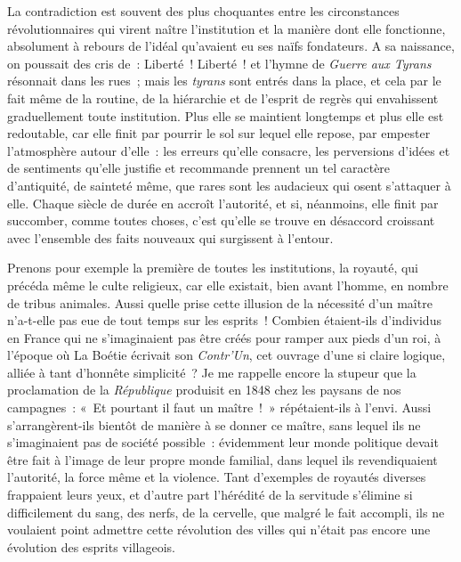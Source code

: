 \documentclass[french,twoside]{book} %
\begin{document}
La contradiction est souvent des plus choquantes entre les circonstances révolutionnaires qui virent naître l’institution et la manière dont elle fonctionne, absolument à rebours de l’idéal qu’avaient eu ses naïfs fondateurs. A sa naissance, on poussait des cris de : Liberté ! Liberté ! et l’hymne de \emph{Guerre  aux Tyrans} résonnait dans les rues ; mais les \emph{tyrans} sont entrés dans la place, et cela par le fait même de la routine, de la hiérarchie et de l’esprit de regrès qui envahissent graduellement toute institution. Plus elle se maintient longtemps et plus elle est redoutable, car elle finit par pourrir le sol sur lequel elle repose, par empester l’atmosphère autour d’elle : les erreurs qu’elle consacre, les perversions d’idées et de sentiments qu’elle justifie et recommande prennent un tel caractère d’antiquité, de sainteté même, que rares sont les audacieux qui osent s’attaquer à elle. Chaque siècle de durée en accroît l’autorité, et si, néanmoins, elle finit par succomber, comme toutes choses, c’est qu’elle se trouve en désaccord croissant avec l’ensemble  des faits nouveaux qui surgissent à l’entour.\par
Prenons pour exemple la première de toutes les institutions, la royauté, qui précéda même le culte religieux, car elle existait, bien avant l’homme, en nombre de tribus animales. Aussi quelle prise cette illusion de la nécessité d’un maître n’a-t-elle pas eue de tout temps sur les esprits ! Combien étaient-ils d’individus en France qui ne s’imaginaient pas être créés pour ramper aux pieds d’un roi, à l’époque où La Boétie écrivait son \emph{Contr’Un}, cet ouvrage d’une si claire logique, alliée à tant d’honnête simplicité ? Je me rappelle encore la stupeur que la proclamation de la \emph{République} produisit en 1848 chez les paysans de nos campagnes :  « Et pourtant il faut un maître ! » répétaient-ils à l’envi. Aussi s’arrangèrent-ils bientôt de manière à se donner ce maître, sans lequel ils ne s’imaginaient pas de société possible : évidemment leur monde politique devait être fait à l’image de leur propre monde familial, dans lequel ils revendiquaient l’autorité, la force même et la violence. Tant d’exemples de royautés diverses frappaient leurs yeux, et d’autre part l’hérédité de la servitude s’élimine si difficilement du sang, des nerfs, de la cervelle, que malgré le fait accompli, ils ne voulaient point admettre cette révolution des villes qui n’était pas encore une évolution des esprits villageois.\par
\end{document}

